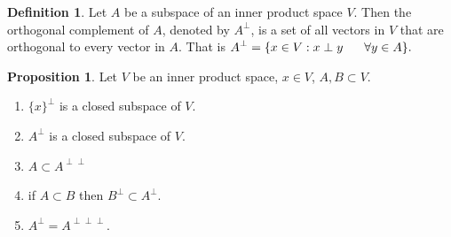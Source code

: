 \documentclass[11pt,a4paper]{article}
\theoremstyle{definition}
\newtheorem{defn}[thm]{Definition}
\newtheorem{prop}[thm]{Proposition}
\begin{document}
\begin{defn}
Let $A$ be a subspace of an inner product space $V$. Then the orthogonal complement of $A$, denoted by $A^{\perp}$, is a set of all vectors in $V$ that are orthogonal to every vector in $A$. That is \hspace{0.2cm}$\displaystyle{A^{\perp}=\{x\in V:x\perp y\hspace{0.6cm} \forall y\in A\}}.$

\end{defn}


\begin{prop}
Let $V$ be an inner product space, $x\in V$, $A,B\subset V$.
\begin{enumerate}
\item $\{x\}^{\perp}$ is a closed subspace of $V$.
\item $A^{\perp}$ is a closed subspace of $V$.
\item $A\subset A^{\perp \perp}$
\item if $A\subset B$ then $B^{\perp}\subset A^{\perp}$.
\item $A^{\perp}=A^{\perp \perp \perp}$.
\end{enumerate}
\end{prop}
\end{document}
